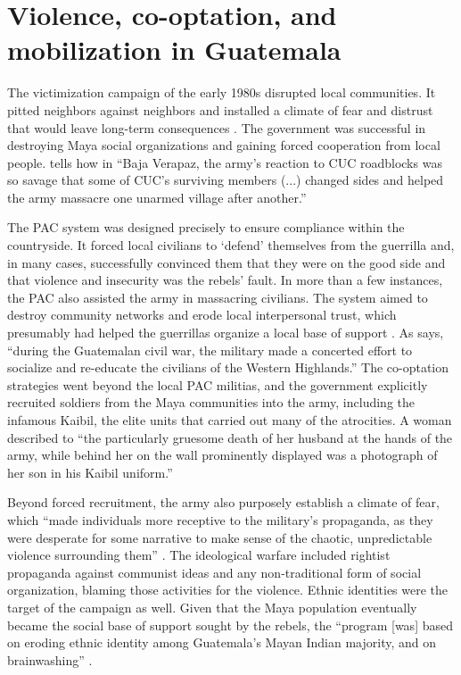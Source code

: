 \documentclass[12pt, notitlepage]{article}
\begin{document}
\section*{Violence, co-optation, and mobilization in Guatemala}

The victimization campaign of the early 1980s disrupted local communities. It pitted neighbors against neighbors and installed a climate of fear and distrust that would leave long-term consequences \citep{Burrell:2013aa}.
The government was successful in destroying Maya social organizations and gaining forced cooperation from local people.
\citet[101]{Stoll:1999aa} tells how in ``Baja Verapaz, the army's reaction to CUC roadblocks was so savage that some of CUC's surviving members (...) changed sides and helped the army massacre one unarmed village after another.''

The PAC system was designed precisely to ensure compliance within the countryside.
It forced local civilians to `defend' themselves from the guerrilla and, in many cases, successfully convinced them that they were on the good side and that violence and insecurity was the rebels' fault.
In more than a few instances, the PAC also assisted the army in massacring civilians.
The system aimed to destroy community networks and erode local interpersonal trust, which presumably had helped the guerrillas organize a local base of support \citep{SaenzdeTejada:2004aa}.
As \citet[641]{Bateson:2017aa} says, ``during the Guatemalan civil war, the military made a concerted effort to socialize and re-educate the civilians of the Western Highlands.''
The co-optation strategies went beyond the local PAC militias, and the government explicitly recruited soldiers from the Maya communities into the army, including the infamous Kaibil, the elite units that carried out many of the atrocities.
A woman described to \citet[112]{Green:1995aa} ``the particularly gruesome death of her husband at the hands of the army, while behind her on the wall prominently displayed was a photograph of her son in his Kaibil uniform.''

Beyond forced recruitment, the army also purposely establish a climate of fear, which ``made individuals more receptive to the military's propaganda, as they were desperate for some narrative to make sense of the chaotic, unpredictable violence surrounding them'' \citep[643]{Bateson:2017aa}.
The ideological warfare included rightist propaganda against communist ideas and any non-traditional form of social organization, blaming those activities for the violence.
Ethnic identities were the target of the campaign as well.
Given that the Maya population eventually became the social base of support sought by the rebels, the ``program [was] based on eroding ethnic identity among Guatemala's Mayan Indian majority, and on brainwashing'' \citep[21]{Black:1985aa}.
\end{document}
